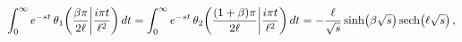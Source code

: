 \[\int_{0}^{\infty}e^{-st}\mathop{\theta_{1}\/}\nolimits\!\left(\frac{\beta\pi}{%
2\ell}\middle|\frac{i\pi t}{\ell^{2}}\right)dt=\int_{0}^{\infty}e^{-st}\mathop%
{\theta_{2}\/}\nolimits\!\left(\frac{(1+\beta)\pi}{2\ell}\middle|\frac{i\pi t}%
{\ell^{2}}\right)dt=-\frac{\ell}{\sqrt{s}}\mathop{\sinh\/}\nolimits\!\left(%
\beta\sqrt{s}\right)\mathop{\mathrm{sech}\/}\nolimits\!\left(\ell\sqrt{s}%
\right),\]
